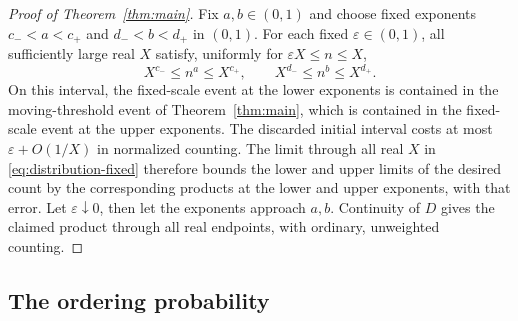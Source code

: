 \begin{proof}[Proof of Theorem~\ref{thm:main}]
Fix $a,b\in(0,1)$ and choose fixed exponents
$c_-<a<c_+$ and $d_-<b<d_+$ in $(0,1)$.
For each fixed $\varepsilon\in(0,1)$, all sufficiently large
real $X$ satisfy, uniformly for $\varepsilon X\le n\le X$,
\[
 X^{c_-}\le n^a\le X^{c_+},\qquad
 X^{d_-}\le n^b\le X^{d_+}.
\]
On this interval, the fixed-scale event at the lower exponents is
contained in the moving-threshold event of Theorem~\ref{thm:main},
which is contained in the fixed-scale event at the upper exponents.
The discarded initial interval costs at most
$\varepsilon+O(1/X)$ in normalized counting.  The limit through all
real $X$ in \eqref{eq:distribution-fixed} therefore bounds the lower and
upper limits of the desired count by the corresponding products at the
lower and upper exponents, with that error.  Let
$\varepsilon\downarrow0$, then let the exponents approach $a,b$.
Continuity of $D$ gives the claimed product through all real endpoints,
with ordinary, unweighted counting.
\end{proof}

\subsection{The ordering probability}

